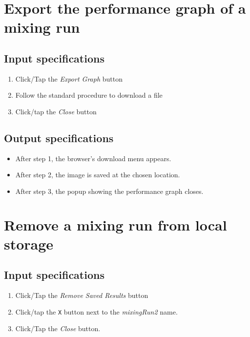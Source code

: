 \section{Export the performance graph of a mixing run}

\subsection*{Input specifications}
\begin{enumerate}
\item Click/Tap the \emph{Export Graph} button
\item Follow the standard procedure to download a file
\item Click/tap the \emph{Close} button
\end{enumerate}

\subsection*{Output specifications}
\begin{itemize}
\item After step 1, the browser's download menu appears.
\item After step 2, the image is saved at the chosen location.
\item After step 3, the popup showing the performance graph closes.
\end{itemize}
 
\section{Remove a mixing run from local storage}

\subsection*{Input specifications}
\begin{enumerate}
\item Click/Tap the \emph{Remove Saved Results} button
\item Click/tap the \texttt{X} button next to the \emph{mixingRun2} name.
\item Click/Tap the \emph{Close} button.
\end{enumerate}

